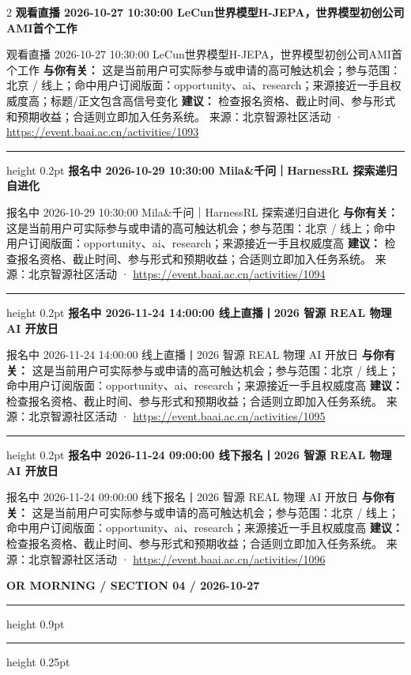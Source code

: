 \documentclass[10.5pt]{ctexart}
\begin{document}
\begin{multicols}{2}
{\large\bfseries 观看直播 2026-10-27 10:30:00 LeCun世界模型H-JEPA，世界模型初创公司AMI首个工作}\par
观看直播 2026-10-27 10:30:00 LeCun世界模型H-JEPA，世界模型初创公司AMI首个工作
\textbf{与你有关：} 这是当前用户可实际参与或申请的高可触达机会；参与范围：北京 / 线上；命中用户订阅版面：opportunity、ai、research；来源接近一手且权威度高；标题/正文包含高信号变化
\textbf{建议：} 检查报名资格、截止时间、参与形式和预期收益；合适则立即加入任务系统。
{\footnotesize\color{ormuted} 来源：北京智源社区活动 · \url{https://event.baai.ac.cn/activities/1093}}
\vspace{2mm}
\hrule height 0.2pt
\vspace{2mm}
{\large\bfseries 报名中 2026-10-29 10:30:00 Mila\&千问｜HarnessRL 探索递归自进化}\par
报名中 2026-10-29 10:30:00 Mila\&千问｜HarnessRL 探索递归自进化
\textbf{与你有关：} 这是当前用户可实际参与或申请的高可触达机会；参与范围：北京 / 线上；命中用户订阅版面：opportunity、ai、research；来源接近一手且权威度高
\textbf{建议：} 检查报名资格、截止时间、参与形式和预期收益；合适则立即加入任务系统。
{\footnotesize\color{ormuted} 来源：北京智源社区活动 · \url{https://event.baai.ac.cn/activities/1094}}
\vspace{2mm}
\hrule height 0.2pt
\vspace{2mm}
{\large\bfseries 报名中 2026-11-24 14:00:00 线上直播丨2026 智源 REAL 物理 AI 开放日}\par
报名中 2026-11-24 14:00:00 线上直播丨2026 智源 REAL 物理 AI 开放日
\textbf{与你有关：} 这是当前用户可实际参与或申请的高可触达机会；参与范围：北京 / 线上；命中用户订阅版面：opportunity、ai、research；来源接近一手且权威度高
\textbf{建议：} 检查报名资格、截止时间、参与形式和预期收益；合适则立即加入任务系统。
{\footnotesize\color{ormuted} 来源：北京智源社区活动 · \url{https://event.baai.ac.cn/activities/1095}}
\vspace{2mm}
\hrule height 0.2pt
\vspace{2mm}
{\large\bfseries 报名中 2026-11-24 09:00:00 线下报名丨2026 智源 REAL 物理 AI 开放日}\par
报名中 2026-11-24 09:00:00 线下报名丨2026 智源 REAL 物理 AI 开放日
\textbf{与你有关：} 这是当前用户可实际参与或申请的高可触达机会；参与范围：北京 / 线上；命中用户订阅版面：opportunity、ai、research；来源接近一手且权威度高
\textbf{建议：} 检查报名资格、截止时间、参与形式和预期收益；合适则立即加入任务系统。
{\footnotesize\color{ormuted} 来源：北京智源社区活动 · \url{https://event.baai.ac.cn/activities/1096}}
\end{multicols}
\newpage
{\small\bfseries OR MORNING / SECTION 04 / 2026-10-27}
\vspace{2mm}
\hrule height 0.9pt
\vspace{1.5mm}
\hrule height 0.25pt
\vspace{4mm}
\end{document}
